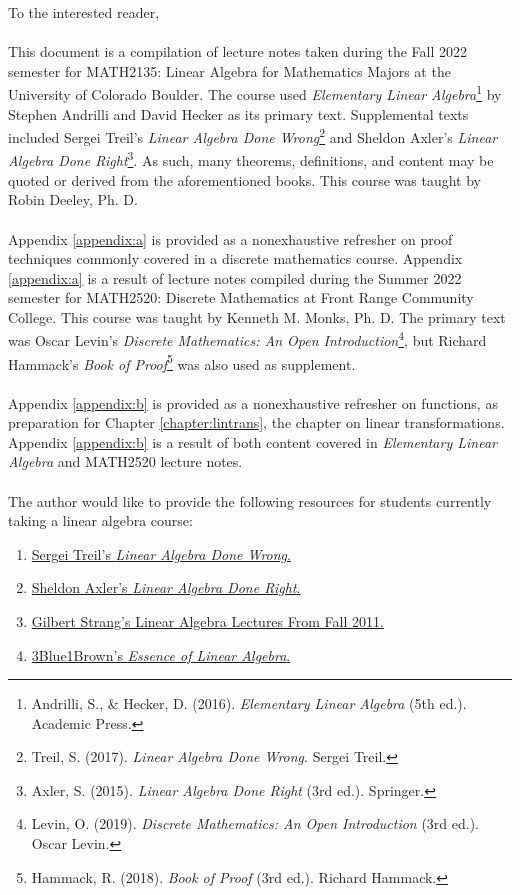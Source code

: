 To the interested reader,
\\
\\
This document is a compilation of lecture notes taken during the Fall 2022 semester for MATH2135: Linear Algebra for Mathematics Majors at the University of Colorado Boulder. The course used \textit{Elementary Linear Algebra}\footnote{Andrilli, S., \& Hecker, D. (2016). \textit{Elementary Linear Algebra} (5th ed.). Academic Press.} by Stephen Andrilli and David Hecker as its primary text. Supplemental texts included Sergei Treil's \textit{Linear Algebra Done Wrong}\footnote{Treil, S. (2017). \textit{Linear Algebra Done Wrong}. Sergei Treil.} and Sheldon Axler's \textit{Linear Algebra Done Right}\footnote{Axler, S. (2015). \textit{Linear Algebra Done Right} (3rd ed.). Springer. }. As such, many theorems, definitions, and content may be quoted or derived from the aforementioned books. This course was taught by Robin Deeley, Ph. D.
\\
\\
Appendix \ref{appendix:a} is provided as a nonexhaustive refresher on proof techniques commonly covered in a discrete mathematics course. Appendix \ref{appendix:a} is a result of lecture notes compiled during the Summer 2022 semester for MATH2520: Discrete Mathematics at Front Range Community College. This course was taught by Kenneth M. Monks, Ph. D. The primary text was Oscar Levin's \textit{Discrete Mathematics: An Open Introduction}\footnote{Levin, O. (2019). \textit{Discrete Mathematics: An Open Introduction} (3rd ed.). Oscar Levin.}, but Richard Hammack's \textit{Book of Proof}\footnote{Hammack, R. (2018). \textit{Book of Proof} (3rd ed.). Richard Hammack.} was also used as supplement.
\\
\\
Appendix \ref{appendix:b} is provided as a nonexhaustive refresher on functions, as preparation for Chapter \ref{chapter:lintrans}, the chapter on linear transformations. Appendix \ref{appendix:b} is a result of both content covered in \textit{Elementary Linear Algebra} and MATH2520 lecture notes.
\\
\\
The author would like to provide the following resources for students currently taking a linear algebra course:
\begin{enumerate}
    \item \href{https://www.math.brown.edu/streil/papers/LADW/LADW_2017-09-04.pdf}{Sergei Treil's \textit{Linear Algebra Done Wrong}.}
    \item \href{https://link.springer.com/book/10.1007/978-3-319-11080-6?utm_medium=affiliate&utm_source=commission_junction_authors&utm_campaign=CONR_BOOKS_ECOM_GL_PHSS_ALWYS_DEEPLINK&utm_content=deeplink&utm_term=PID100197440&CJEVENT=f9f74b076a4c11ed80fe023d0a1c0e0d}{Sheldon Axler's \textit{Linear Algebra Done Right}.}
    \item \href{https://youtube.com/playlist?list=PL221E2BBF13BECF6C}{Gilbert Strang's Linear Algebra Lectures From Fall 2011.}
    \item \href{https://www.youtube.com/playlist?app=desktop&list=PLZHQObOWTQDPD3MizzM2xVFitgF8hE_ab}{3Blue1Brown's \textit{Essence of Linear Algebra}.}
\end{enumerate}
